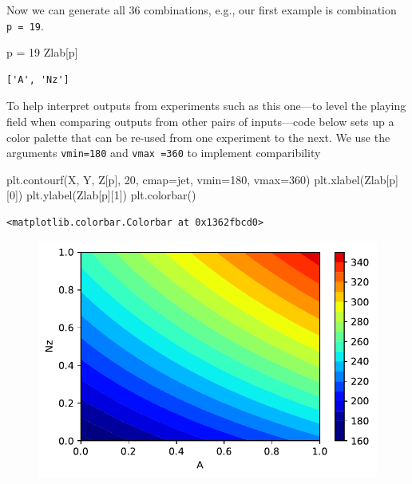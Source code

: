 \documentclass[
  letterpaper,
  DIV=11,
  numbers=noendperiod]{scrreprt}
\newenvironment{Shaded}{\begin{snugshade}}{\end{snugshade}}
\newcommand{\DecValTok}[1]{\textcolor[rgb]{0.68,0.00,0.00}{#1}}
\newcommand{\NormalTok}[1]{\textcolor[rgb]{0.00,0.23,0.31}{#1}}
\newcommand{\OperatorTok}[1]{\textcolor[rgb]{0.37,0.37,0.37}{#1}}
\newcommand{\StringTok}[1]{\textcolor[rgb]{0.13,0.47,0.30}{#1}}
\begin{document}
Now we can generate all 36 combinations, e.g., our first example is
combination \texttt{p\ =\ 19}.

\begin{Shaded}
\begin{Highlighting}[]
\NormalTok{p }\OperatorTok{=} \DecValTok{19}
\NormalTok{Zlab[p]}
\end{Highlighting}
\end{Shaded}

\begin{verbatim}
['A', 'Nz']
\end{verbatim}

To help interpret outputs from experiments such as this one---to level
the playing field when comparing outputs from other pairs of
inputs---code below sets up a color palette that can be re-used from one
experiment to the next. We use the arguments \texttt{vmin=180} and
\texttt{vmax\ =360} to implement comparibility

\begin{Shaded}
\begin{Highlighting}[]
\NormalTok{plt.contourf(X, Y, Z[p], }\DecValTok{20}\NormalTok{, cmap}\OperatorTok{=}\StringTok{\textquotesingle{}jet\textquotesingle{}}\NormalTok{, vmin}\OperatorTok{=}\DecValTok{180}\NormalTok{, vmax}\OperatorTok{=}\DecValTok{360}\NormalTok{)}
\NormalTok{plt.xlabel(Zlab[p][}\DecValTok{0}\NormalTok{])}
\NormalTok{plt.ylabel(Zlab[p][}\DecValTok{1}\NormalTok{])}
\NormalTok{plt.colorbar()}
\end{Highlighting}
\end{Shaded}

\begin{verbatim}
<matplotlib.colorbar.Colorbar at 0x1362fbcd0>
\end{verbatim}

\begin{figure}[H]

{\centering \includegraphics{002_awwe_files/figure-pdf/cell-11-output-2.pdf}

}

\end{figure}
\end{document}
